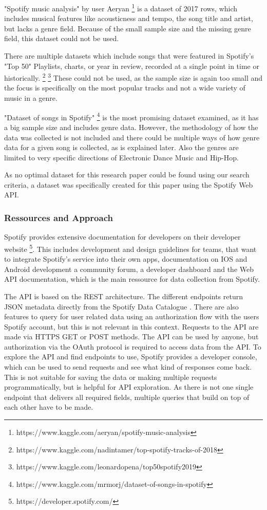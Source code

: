 "Spotify music analysis" by user Aeryan \footnote{https://www.kaggle.com/aeryan/spotify-music-analysis}
is a dataset of 2017 rows, which includes musical features like acousticness and tempo,
the song title and artist, but lacks a genre field. Because of the small sample size
and the missing genre field, this dataset could not be used.

There are multiple datasets which include songs that were featured in Spotify's "Top 50" Playlists,
charts, or year in review, recorded at a single point in time or historically.
\footnote{https://www.kaggle.com/nadintamer/top-spotify-tracks-of-2018}
\footnote{https://www.kaggle.com/leonardopena/top50spotify2019}
These could not be used, as the sample size is again too small and the focus is specifically
on the most popular tracks and not a wide variety of music in a genre.

"Dataset of songs in Spotify" \footnote{https://www.kaggle.com/mrmorj/dataset-of-songs-in-spotify}
is the most promising dataset examined, as it has a big sample size and includes genre data.
However, the methodology of how the data was collected is not included and there
could be multiple ways of how genre data for a given song is collected, as is explained later.
Also the genres are limited to very specific directions of Electronic Dance Music and Hip-Hop.

As no optimal dataset for this research paper could be found using our search criteria,
a dataset was specifically created for this paper using the Spotify Web API.

\subsubsection{Ressources and Approach}

Spotify provides extensive documentation for developers on their developer website \footnote {https://developer.spotify.com/}.
This includes development and design guidelines for teams, that want to integrate
Spotify's service into their own apps, documentation on IOS and Android development
a community forum, a developer dashboard and the Web API documentation, which is the main ressource
for data collection from Spotify.

The \ac{API} is based on the \ac{REST} architecture. The different endpoints return JSON metadata
directly from the Spotify Data Catalogue \cite[]{SpotifyWebAPI}. There are also features to query for
user related data using an authorization flow with the users Spotify account, but this is not relevant
in this context. \cite{SpotifyWebAPI} Requests to the \ac{API} are made via HTTPS GET or POST methods.
The \ac{API} can be used by anyone, but authorization via the OAuth protocol is required to access data
from the \ac{API}. 
To explore the \ac{API} and find endpoints to use, Spotify provides a developer console, which can be used to 
send requests and see what kind of responses come back. This is not suitable for saving the data or making multiple
requests programmatically, but is helpful for API exploration. As there is not one single endpoint that delivers all
required fields, multiple queries that build on top of each other have to be made.

